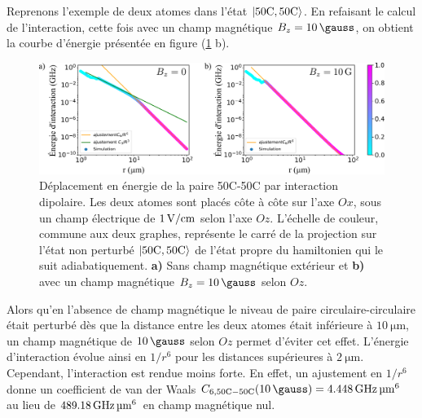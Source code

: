 Reprenons l'exemple de deux atomes dans l'état $\ket{\mathrm{50C,50C}}$.
En refaisant le calcul de l'interaction, cette fois avec un champ magnétique $B_z=\SI{10}{\gauss}$, on obtient la courbe d'énergie présentée en figure (\ref{fig:VdW_50C50C_1Vcm_10G} b).
%
\begin{figure}[h]
\centering
\includegraphics[width=\linewidth]{figures/circsim/VdW_50C50C_1Vcm_0_10G}
\caption[Interaction dipolaire 50C-50C en présence d'un champ magnétique]{
Déplacement en énergie de la paire 50C-50C par interaction dipolaire.
Les deux atomes sont placés côte à côte sur l'axe $Ox$, sous un champ électrique de $\SIvv{1}{\V / \cm}$ selon l'axe $Oz$. L'échelle de couleur, commune aux deux graphes, représente le carré de la projection sur l'état non perturbé $\ket{50\text{C},50\text{C}}$ de l'état propre du hamiltonien qui le suit adiabatiquement.
\textbf{a)} Sans champ magnétique extérieur et \textbf{b)} avec un champ magnétique $B_z = \SI{10}{\gauss}$ selon $Oz$.
}
\label{fig:VdW_50C50C_1Vcm_10G}
\end{figure}
%
Alors qu'en l'absence de champ magnétique le niveau de paire circulaire-circulaire était perturbé dès que la distance entre les deux atomes était inférieure à $\SI{10}{\um}$, un champ magnétique de $\SI{10}{\gauss}$ selon $Oz$ permet d'éviter cet effet.
L'énergie d'interaction évolue ainsi en $1/r^6$ pour les distances supérieures à $\SI{2}{\um}$.
Cependant, l'interaction est rendue moins forte.
En effet, un ajustement en $1/r^6$ donne un coefficient de van der Waals $C_{6,\mathrm{50C-50C}}(\SI{10}{\gauss}) = \SI{4.448}{\GHz\raiseto{6}\um}$ au lieu de $\SI{489.18}{\GHz\raiseto{6}\um}$ en champ magnétique nul.
